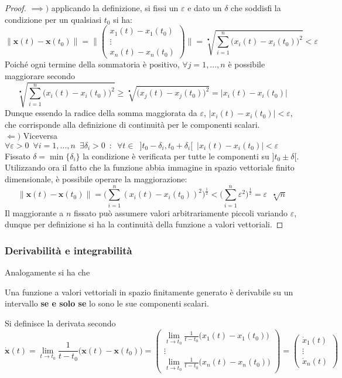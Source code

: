 \documentclass[10pt]{article}
\theoremstyle{plain}
\begin{document}
\begin{proof}
$\implies )$ applicando la definizione, si fissi un $\varepsilon$ e dato un $\delta$ che soddisfi la condizione per un qualsiasi $t_0$ si ha:
\[\|\mathbf{x}(t) - \mathbf{x}(t_0)\| = \big\|\begin{pmatrix}
x_1(t) - x_1(t_0)\\
\vdots\\
x_n(t) - x_n(t_0)
\end{pmatrix}\big\| = \sqrt[•]{\sum\limits_{i=1}^n\big(x_i(t) - x_i(t_0)\big)^2} < \varepsilon\]
Poiché ogni termine della sommatoria è positivo, $\forall j = 1, ..., n$ è possibile maggiorare secondo
\[\sqrt[•]{\sum\limits_{i=1}^n\big(x_i(t) - x_i(t_0)\big)^2} \geq \sqrt[•]{\big(x_j(t) - x_j(t_0)\big)^2} = |x_i(t) - x_i(t_0)|\]
Dunque essendo la radice della somma maggiorata da $\varepsilon$, $\displaystyle |x_i(t) - x_i(t_0)| < \varepsilon$, che corrisponde alla definizione di continuità per le componenti scalari.
\\$\Leftarrow )$ Viceversa $\displaystyle \forall \varepsilon > 0 \enspace \forall i = 1, ..., n \enspace \exists \delta_i > 0 \enspace : \enspace \forall t \in \enspace ]t_0 - \delta_i, t_0 + \delta_i[ \enspace |x_i(t) - x_i(t_0)| < \varepsilon$
\\Fissato $\delta = \min\{\delta_i\}$ la condizione è verificata per tutte le componenti su $]t_0 \pm \delta[$. Utilizzando ora il fatto che la funzione abbia immagine in spazio vettoriale finito dimensionale, è possibile operare la maggiorazione:
\[\|\mathbf{x}(t) - \mathbf{x}(t_0)\| = \big(\sum\limits_{i=1}^n(x_i(t) - x_i(t_0))^2\big)^{\frac{1}{2}} < \big(\sum\limits_{i=1}^n \varepsilon^2\big)^{\frac{1}{2}} = \varepsilon \enspace \sqrt[•]{n}\]
Il maggiorante a $n$ fissato può assumere valori arbitrariamente piccoli variando $\varepsilon$, dunque per definizione si ha la continuità della funzione a valori vettoriali.
\end{proof}

\subsubsection{Derivabilità e integrabilità}
Analogamente si ha che
\begin{prop}
Una funzione a valori vettoriali in spazio finitamente generato è derivabile su un intervallo \textbf{se e solo se} lo sono le sue componenti scalari.
\end{prop}
Si definisce la derivata secondo
\[\dot{\mathbf{x}}(t) = \lim\limits_{t \rightarrow t_0} \frac{1}{t-t_0}\big(\mathbf{x}(t) - \mathbf{x}(t_0)\big) = \begin{pmatrix}
\displaystyle \lim\limits_{t \rightarrow t_0} \frac{1}{t-t_0}\big(x_1(t) - x_1(t_0)\big)\\
\vdots \\
\displaystyle \lim\limits_{t \rightarrow t_0} \frac{1}{t-t_0}\big(x_n(t) - x_n(t_0)\big)
\end{pmatrix} = \begin{pmatrix}
\dot{x}_1(t)\\
\vdots\\
\dot{x}_n(t)
\end{pmatrix}
\]
\end{document}
